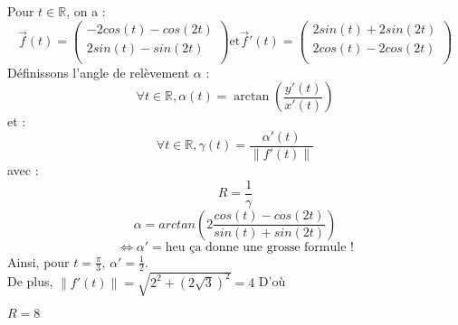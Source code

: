 Pour $t\in\mathbb{R}$, on a :
\[
  \overrightarrow{f}(t) =
  \left(
  \begin{array}{c}
      -2cos(t)-cos(2t) \\
      2sin(t)-sin(2t)  \\
    \end{array}
  \right)
  \text{et}
  \overrightarrow{f}'(t) =
  \left(
  \begin{array}{c}
      2sin(t)+2sin(2t) \\
      2cos(t)-2cos(2t) \\
    \end{array}
  \right)
\]
Définissons l'angle de relèvement $\alpha$ :
\[\forall t\in\mathbb{R}, \alpha(t) = \arctan{\left(\frac{y'(t)}{x'(t)}\right)}\]
et :
\[
  \forall t\in\mathbb{R},\gamma(t) = \frac{\alpha'(t)}{\left\|f'(t)\right\|}
\]
avec :
\[
  R = \frac{1}{\gamma}
\]
\[
  \alpha = arctan
  \left(2
  \frac{cos(t)-cos(2t)}{sin(t)+sin(2t)}
  \right)
\]
\[
  \iff
  \alpha' = \text{heu ça donne une grosse formule !}
\]
Ainsi, pour $t = \frac{\pi}{3}$, $\alpha' = \frac{1}{2}$.\\
De plus,
$\left\|f'(t)\right\| = \sqrt{2^2+\left(2\sqrt{3}\right)^2} = 4$
D'où
\begin{result}
  $R = 8$
\end{result}
